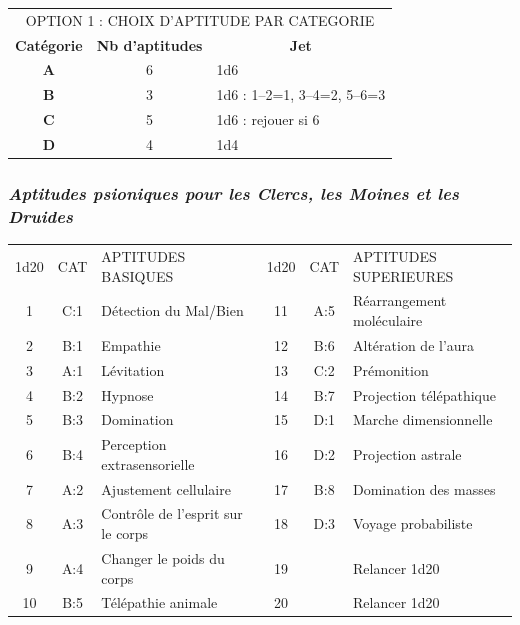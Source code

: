 \documentclass[11pt]{article}
\begin{document}
{\bigskip

\begin{tabular}{ccl}
\multicolumn{3}{c}{OPTION 1 : CHOIX D'APTITUDE PAR CATEGORIE} \\
\textbf{Catégorie} &  \textbf{Nb d'aptitudes} & \multicolumn{1}{c}{\textbf{Jet}} \\
\textbf{A} & 6 & 1d6 \\
\textbf{B} & 3 & 1d6 : 1--2=1, 3--4=2, 5--6=3 \\
\textbf{C} & 5 & 1d6 : rejouer si 6 \\
\textbf{D} & 4 & 1d4 \\
\end{tabular}





\newpage
\subsubsection*{\textit{Aptitudes psioniques pour les Clercs, les Moines et les Druides}}

\bigskip

\begin{tabular}{cclccl}
1d20 & CAT & APTITUDES BASIQUES & 1d20 & CAT & APTITUDES SUPERIEURES \\
1   & C:1 & Détection du Mal/Bien  & 11     & A:5 & Réarrangement moléculaire  \\
2   & B:1 & Empathie  & 12                  & B:6 & Altération de l'aura  \\
3   & A:1 & Lévitation & 13                 & C:2 & Prémonition  \\
4   & B:2 & Hypnose  & 14                   & B:7 & Projection télépathique  \\
5   & B:3 & Domination  & 15                & D:1 & Marche dimensionnelle \\
6   & B:4 & Perception extrasensorielle & 16 & D:2 & Projection astrale  \\
7   & A:2 & Ajustement cellulaire  & 17     & B:8 & Domination des masses  \\
8   & A:3 & Contrôle de l'esprit sur le corps  & 18 & D:3 & Voyage probabiliste \\
9   & A:4 & Changer le poids du corps  & 19 && Relancer 1d20 \\
10  & B:5 & Télépathie animale  & 20 && Relancer 1d20 \\
\end{tabular}

}
\end{document}
